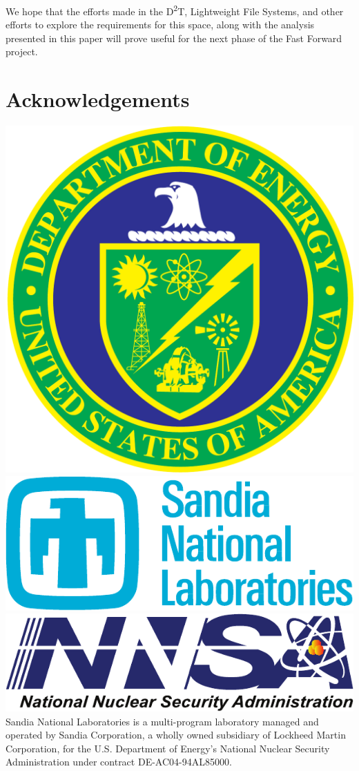 \documentclass[conference]{IEEEtran}
\newcommand{\DDTns}{D\textsuperscript{2}T}
\begin{document}
We hope that the efforts made in the \DDTns, Lightweight File Systems, and
other efforts to explore the requirements for this space, along with the
analysis presented in this paper will prove useful for the next phase of the
Fast Forward project.

\section{Acknowledgements}
\includegraphics[scale=0.07]{logos/doe_logo}
\includegraphics[scale=0.30]{logos/snl_logo}
\includegraphics[scale=0.35]{logos/nnsa_logo}
Sandia National Laboratories is a multi-program laboratory managed and operated
by Sandia Corporation, a wholly owned subsidiary of Lockheed Martin
Corporation, for the U.S. Department of Energy's National Nuclear Security
Administration under contract DE-AC04-94AL85000.




\vfill\eject
\end{document}
